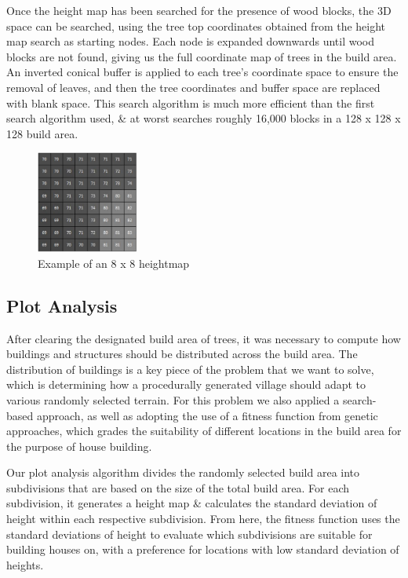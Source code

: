 \documentclass[11pt, oneside]{article}
\begin{document}
\begin{normalsize}
Once the height map has been searched for the presence of wood blocks, the 3D space can be searched, using the tree top coordinates obtained from the height map search as starting nodes. Each node is expanded downwards until wood blocks are not found, giving us the full coordinate map of trees in the build area. An inverted conical buffer is applied to each tree's coordinate space to ensure the removal of leaves, and then the tree coordinates and buffer space are replaced with blank space. This search algorithm is much more efficient than the first search algorithm used, \& at worst searches roughly 16,000 blocks in a 128 x 128 x 128 build area.

\begin{figure}[H]
\centering
\includegraphics[width=0.3\textwidth]{height}
\caption{Example of an 8 x 8 heightmap \cite{esko2021multi}}
\label{fig:height}
\end{figure}

\subsection{Plot Analysis}

After clearing the designated build area of trees, it was necessary to compute how buildings and structures should be distributed across the build area. The distribution of buildings is a key piece of the problem that we want to solve, which is determining how a procedurally generated village should adapt to various randomly selected terrain. For this problem we also applied a search-based approach, as well as adopting the use of a fitness function from genetic approaches, which grades the suitability of different locations in the build area for the purpose of house building.

Our plot analysis algorithm divides the randomly selected build area into subdivisions that are based on the size of the total build area. For each subdivision, it generates a height map \& calculates the standard deviation of height within each respective subdivision. From here, the fitness function uses the standard deviations of height to evaluate which subdivisions are suitable for building houses on, with a preference for locations with low standard deviation of heights.


\end{normalsize}
\end{document}
